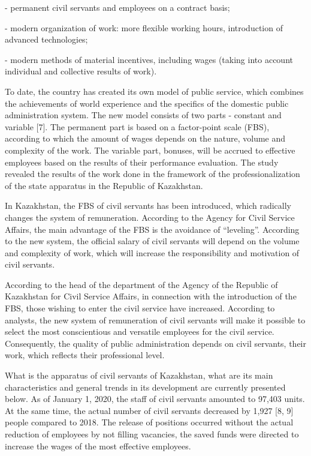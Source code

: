 \begin{multicols}{2}
- permanent civil servants and employees on a contract basis;

- modern organization of work: more flexible working hours, introduction
of advanced technologies;

- modern methods of material incentives, including wages (taking into
account individual and collective results of work).

To date, the country has created its own model of public service, which
combines the achievements of world experience and the specifics of the
domestic public administration system. The new model consists of two
parts - constant and variable {[}7{]}. The permanent part is based on a
factor-point scale (FBS), according to which the amount of wages depends
on the nature, volume and complexity of the work. The variable part,
bonuses, will be accrued to effective employees based on the results of
their performance evaluation. The study revealed the results of the work
done in the framework of the professionalization of the state apparatus
in the Republic of Kazakhstan.

In Kazakhstan, the FBS of civil servants has been introduced, which
radically changes the system of remuneration. According to the Agency
for Civil Service Affairs, the main advantage of the FBS is the
avoidance of ``leveling''. According to the new system, the official
salary of civil servants will depend on the volume and complexity of
work, which will increase the responsibility and motivation of civil
servants.

According to the head of the department of the Agency of the Republic of
Kazakhstan for Civil Service Affairs, in connection with the
introduction of the FBS, those wishing to enter the civil service have
increased. According to analysts, the new system of remuneration of
civil servants will make it possible to select the most conscientious
and versatile employees for the civil service. Consequently, the quality
of public administration depends on civil servants, their work, which
reflects their professional level.

What is the apparatus of civil servants of Kazakhstan, what are its main
characteristics and general trends in its development are currently
presented below. As of January 1, 2020, the staff of civil servants
amounted to 97,403 units. At the same time, the actual number of civil
servants decreased by 1,927 {[}8, 9{]} people compared to 2018. The
release of positions occurred without the actual reduction of employees
by not filling vacancies, the saved funds were directed to increase the
wages of the most effective employees.


\end{multicols}

